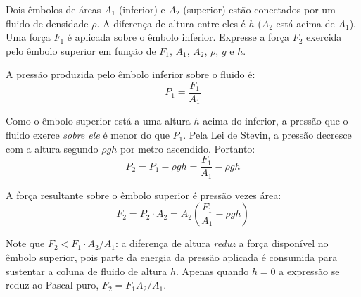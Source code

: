 \begin{exemplo}\label{exemplo_fluidos_pascalex03}

Dois êmbolos de áreas $A_1$ (inferior) e $A_2$ (superior) estão
conectados por um fluido de densidade $\rho$. A diferença de altura entre
eles é $h$ ($A_2$ está acima de $A_1$). Uma força $F_1$ é aplicada sobre
o êmbolo inferior. Expresse a força $F_2$ exercida pelo êmbolo superior
em função de $F_1$, $A_1$, $A_2$, $\rho$, $g$ e $h$.


\resolucao

A pressão produzida pelo êmbolo inferior sobre o fluido é:
\begin{equation}
    P_1 = \frac{F_1}{A_1} \nonumber
\end{equation}

Como o êmbolo superior está a uma altura $h$ acima do inferior, a pressão
que o fluido exerce \emph{sobre ele} é menor do que $P_1$. Pela Lei de
Stevin, a pressão decresce com a altura segundo $\rho g h$ por metro
ascendido. Portanto:
\begin{equation}
    P_2 = P_1 - \rho g h = \frac{F_1}{A_1} - \rho g h \nonumber
\end{equation} 

A força resultante sobre o êmbolo superior é pressão vezes área:
\begin{equation}
    \boxed{F_2 = P_2 \cdot A_2 = A_2\!\left(\frac{F_1}{A_1} - \rho g h\right)} \nonumber
\end{equation}

Note que $F_2 < F_1 \cdot A_2/A_1$: a diferença de altura \emph{reduz}
a força disponível no êmbolo superior, pois parte da energia da pressão
aplicada é consumida para sustentar a coluna de fluido de altura $h$.
Apenas quando $h = 0$ a expressão se reduz ao Pascal puro,
$F_2 = F_1 A_2/A_1$.


\end{exemplo}



\vspace{0.3cm}














